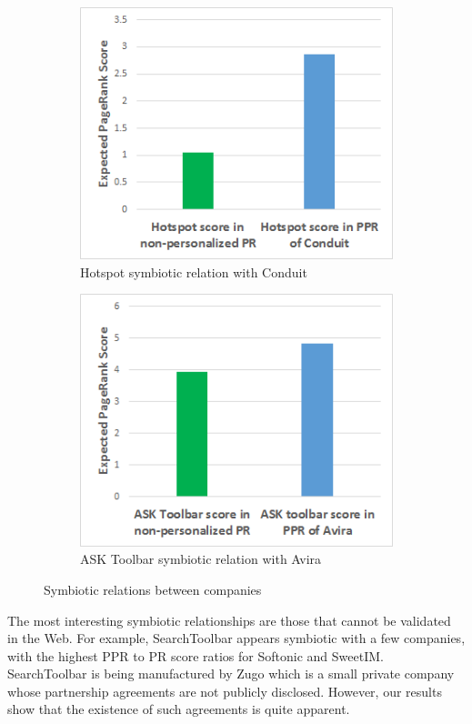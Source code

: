 \documentclass[11pt,oneside]{book}
\begin{document}
\begin{figure}[!htbp]
\centering
\begin{subfigure}[b]{0.8\textwidth}
	\centering
\includegraphics[scale=0.8]{figures/hotspot_sym_conduit.png}
\caption{Hotspot symbiotic relation with Conduit}
\label{fig:hotspot_sym_conduit}
\end{subfigure}
\begin{subfigure}[b]{0.8\textwidth}
	\centering
\includegraphics[scale=0.8]{figures/ask_sym_avira.png}
\caption{ASK Toolbar symbiotic relation with Avira}
\label{fig:ask_sym_avira}
\end{subfigure}
\caption{Symbiotic relations between companies}
	\label{fig:symbiotic_2}
\end{figure}

The most interesting symbiotic relationships are those that cannot be validated in the Web. For example, SearchToolbar appears symbiotic with a few companies, with the highest PPR to PR score ratios for Softonic and SweetIM. SearchToolbar is being manufactured by Zugo which is a small private company whose partnership agreements are not publicly disclosed. However, our results show that the existence of such agreements is quite apparent.
\end{document}
